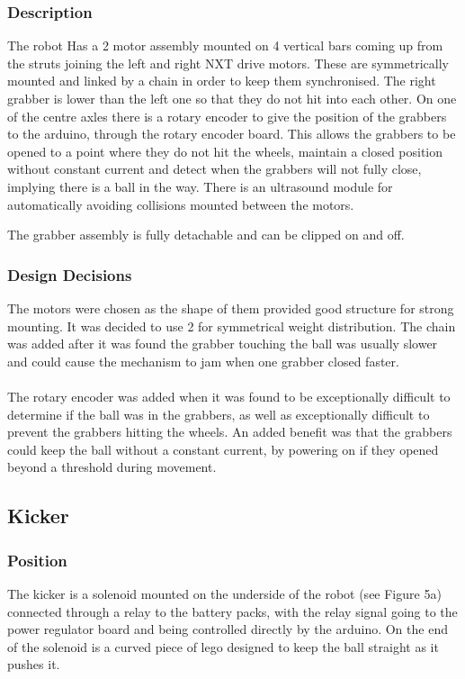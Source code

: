 \subsubsection{Description}
The robot Has a 2 motor assembly mounted on 4 vertical bars coming up from the struts joining the left and right NXT drive motors. These are symmetrically mounted and linked by a chain in order to keep them synchronised. The right grabber is lower than the left one so that they do not hit into each other. On one of the centre axles there is a rotary encoder to give the position of the grabbers to the arduino, through the rotary encoder board. This allows the grabbers to be opened to a point where they do not hit the wheels, maintain a closed position without constant current and detect when the grabbers will not fully close, implying there is a ball in the way. There is an ultrasound module for automatically avoiding collisions mounted between the motors. 

The grabber assembly is fully detachable and can be clipped on and off. 

\subsubsection{Design Decisions}
The motors were chosen as the shape of them provided good structure for strong mounting. It was decided to use 2 for symmetrical weight distribution. The chain was added after it was found the grabber touching the ball was usually slower and could cause the mechanism to jam when one grabber closed faster.
\\ \\
The rotary encoder was added when it was found to be exceptionally difficult to determine if the ball was in the grabbers, as well as exceptionally difficult to prevent the grabbers hitting the wheels. An added benefit was that the grabbers could keep the ball without a constant current, by powering on if they opened beyond a threshold during movement. 



\subsection{Kicker}
\subsubsection{Position}
The kicker is a solenoid mounted on the underside of the robot (see Figure 5a) connected through a relay to the battery packs, with the relay signal going to the power regulator board and being controlled directly by the arduino. On the end of the solenoid is a curved piece of lego designed to keep the ball straight as it pushes it.

